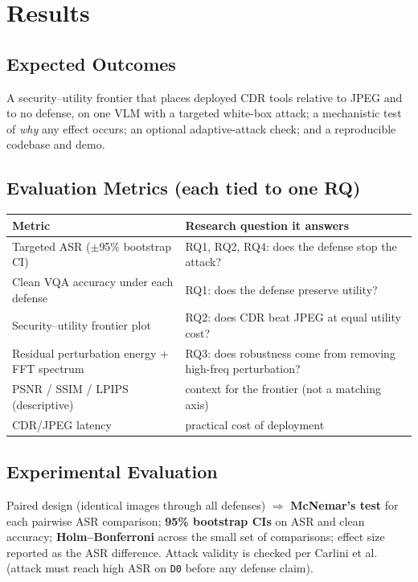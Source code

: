 \documentclass[11pt]{article}
\begin{document}
\section{Results}

\subsection{Expected Outcomes}
A security--utility frontier that places deployed CDR tools relative to JPEG and
to no defense, on one VLM with a targeted white-box attack; a mechanistic test of
\emph{why} any effect occurs; an optional adaptive-attack check; and a
reproducible codebase and demo.

\subsection{Evaluation Metrics (each tied to one RQ)}
\begin{tabularx}{\textwidth}{@{}l Y@{}}
\toprule
\textbf{Metric} & \textbf{Research question it answers} \\
\midrule
Targeted ASR ($\pm$95\% bootstrap CI) & RQ1, RQ2, RQ4: does the defense stop the attack? \\
Clean VQA accuracy under each defense & RQ1: does the defense preserve utility? \\
Security--utility frontier plot & RQ2: does CDR beat JPEG at equal utility cost? \\
Residual perturbation energy + FFT spectrum & RQ3: does robustness come from removing high-freq perturbation? \\
PSNR / SSIM / LPIPS (descriptive) & context for the frontier (not a matching axis) \\
CDR/JPEG latency & practical cost of deployment \\
\bottomrule
\end{tabularx}

\subsection{Experimental Evaluation}
Paired design (identical images through all defenses) $\Rightarrow$
\textbf{McNemar's test} for each pairwise ASR comparison; \textbf{95\% bootstrap
CIs} on ASR and clean accuracy; \textbf{Holm--Bonferroni} across the small set of
comparisons; effect size reported as the ASR difference. Attack validity is
checked per Carlini et al.~\cite{carlini2019evaluating} (attack must reach high
ASR on \texttt{D0} before any defense claim).
\end{document}
